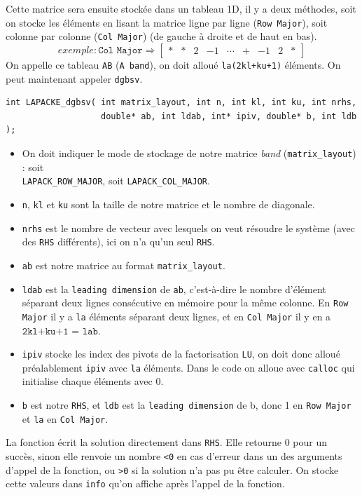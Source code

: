 \documentclass{article}
\begin{document}
Cette matrice sera ensuite stockée dans un tableau 1D, il y a deux méthodes, soit on stocke les éléments en lisant la matrice ligne par ligne (\texttt{Row Major}), soit colonne par colonne (\texttt{Col Major}) (de gauche à droite et de haut en bas).
\[ 
	exemple : \texttt{Col Major} \Longrightarrow
	\begin{bmatrix}
	\ast & \ast	& 2 & -1 & \cdots & \texttt{+} & -1 & 2 & \ast
	\end{bmatrix}
\]
On appelle ce tableau \texttt{AB} (\texttt{A band}), on doit alloué \texttt{la(2kl+ku+1)} éléments.
On peut maintenant appeler \texttt{dgbsv}.
\begin{scriptsize}
\begin{verbatim}
int LAPACKE_dgbsv( int matrix_layout, int n, int kl, int ku, int nrhs, 
                   double* ab, int ldab, int* ipiv, double* b, int ldb );
\end{verbatim}
\end{scriptsize}
\begin{itemize}
\item On doit indiquer le mode de stockage de notre matrice \textit{band} (\texttt{matrix\_layout}) : soit \\ \texttt{LAPACK\_ROW\_MAJOR}, soit \texttt{LAPACK\_COL\_MAJOR}.
\item \texttt{n}, \texttt{kl} et \texttt{ku} sont la taille de notre matrice et le nombre de diagonale.
\item \texttt{nrhs} est le nombre de vecteur avec lesquels on veut résoudre le système (avec des \texttt{RHS} différents), ici on n'a qu'un seul \texttt{RHS}.
\item \texttt{ab} est notre matrice au format \texttt{matrix\_layout}.
\item \texttt{ldab} est la \texttt{leading dimension} de \texttt{ab}, c'est-à-dire le nombre d'élément  séparant deux lignes consécutive en mémoire pour la même colonne. En \texttt{Row Major} il y a \texttt{la} éléments séparant deux lignes, et en \texttt{Col Major} il y en a $\texttt{2kl+ku+1 = lab}$.
\item \texttt{ipiv} stocke les index des pivots de la factorisation \texttt{LU}, on doit donc alloué préalablement \texttt{ipiv} avec \texttt{la} éléments. Dans le code on alloue avec \texttt{calloc} qui initialise chaque éléments avec 0.
\item \texttt{b} est notre \texttt{RHS}, et \texttt{ldb} est la \texttt{leading dimension} de b, donc 1 en \texttt{Row Major} et \texttt{la} en \texttt{Col Major}.
\end{itemize}
La fonction écrit la solution directement dans \texttt{RHS}.
Elle retourne 0 pour un succès, sinon elle renvoie un nombre \texttt{<0} en cas d'erreur dans un des arguments d'appel de la fonction, ou \texttt{>0} si la solution n'a pas pu être calculer. On stocke cette valeurs dans \texttt{info} qu'on affiche après l'appel de la fonction.
\end{document}
